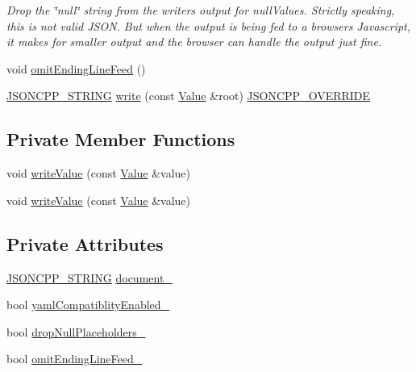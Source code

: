 \begin{DoxyCompactItemize}
\begin{DoxyCompactList}\small\item\em Drop the \char`\"{}null\char`\"{} string from the writer\textquotesingle{}s output for null\+Values. Strictly speaking, this is not valid J\+S\+ON. But when the output is being fed to a browser\textquotesingle{}s Javascript, it makes for smaller output and the browser can handle the output just fine. \end{DoxyCompactList}\item 
void \hyperlink{class_json_1_1_fast_writer_af4ee077d365d75941fb2688d97207a55}{omit\+Ending\+Line\+Feed} ()
\item 
\hyperlink{config_8h_a1e723f95759de062585bc4a8fd3fa4be}{J\+S\+O\+N\+C\+P\+P\+\_\+\+S\+T\+R\+I\+NG} \hyperlink{class_json_1_1_fast_writer_a93d45ba4bc312371d08beb3e3dfbe654}{write} (const \hyperlink{class_json_1_1_value}{Value} \&root) \hyperlink{config_8h_a824d6199c91488107e443226fa6022c5}{J\+S\+O\+N\+C\+P\+P\+\_\+\+O\+V\+E\+R\+R\+I\+DE}
\end{DoxyCompactItemize}
\subsection*{Private Member Functions}
\begin{DoxyCompactItemize}
\item 
void \hyperlink{class_json_1_1_fast_writer_a2ef4a2ce13a341171f01f414f4fdd765}{write\+Value} (const \hyperlink{class_json_1_1_value}{Value} \&value)
\item 
void \hyperlink{class_json_1_1_fast_writer_a2ef4a2ce13a341171f01f414f4fdd765}{write\+Value} (const \hyperlink{class_json_1_1_value}{Value} \&value)
\end{DoxyCompactItemize}
\subsection*{Private Attributes}
\begin{DoxyCompactItemize}
\item 
\hyperlink{config_8h_a1e723f95759de062585bc4a8fd3fa4be}{J\+S\+O\+N\+C\+P\+P\+\_\+\+S\+T\+R\+I\+NG} \hyperlink{class_json_1_1_fast_writer_a5e08c44579db8704dba1ebe37d39fdba}{document\+\_\+}
\item 
bool \hyperlink{class_json_1_1_fast_writer_a4c4c1911179bf472d24492915b0e489a}{yaml\+Compatiblity\+Enabled\+\_\+}
\item 
bool \hyperlink{class_json_1_1_fast_writer_a97e9d4ff84b59a48756dcc27a71b5904}{drop\+Null\+Placeholders\+\_\+}
\item 
bool \hyperlink{class_json_1_1_fast_writer_abd6e13851db6dcf59d84af68d48d50ac}{omit\+Ending\+Line\+Feed\+\_\+}
\end{DoxyCompactItemize}


